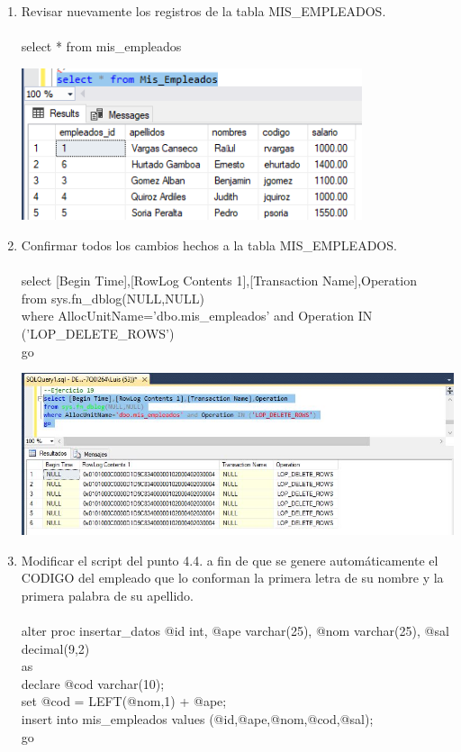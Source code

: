 \begin{enumerate}[1.]
	\item Revisar nuevamente los registros de la tabla MIS\_EMPLEADOS.
          \\
	\\select * from mis\_empleados
	\begin{center}
	\includegraphics[width=10cm]{./Imagenes/22} 
	\end{center}

	\item Confirmar todos los cambios hechos a la tabla MIS\_EMPLEADOS.
          \\
          \\select [Begin Time],[RowLog Contents 1],[Transaction Name],Operation 
          \\from sys.fn\_dblog(NULL,NULL)
          \\where AllocUnitName='dbo.mis\_empleados' and Operation IN ('LOP\_DELETE\_ROWS')
          \\go
	\begin{center}
	\includegraphics[width=15cm]{./Imagenes/1ejer19} 
	\end{center}

	\item Modificar el script del punto 4.4. a fin de que se genere automáticamente el CODIGO del empleado que lo conforman la primera letra de su nombre y la primera palabra de su apellido.
          \\
          \\ alter proc insertar\_datos @id int, @ape varchar(25), @nom varchar(25), @sal decimal(9,2)
          \\as
          \\declare @cod varchar(10);
          \\set @cod = LEFT(@nom,1) + @ape; 
          \\insert into mis\_empleados values (@id,@ape,@nom,@cod,@sal);
          \\go


\end{enumerate}
